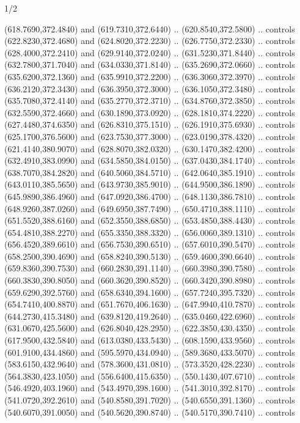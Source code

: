 \begin{flagdescription}{1/2}
\begin{scope}[xshift=0.5\flaglength,yshift=0.5\flagwidth,scale=\flagwidth/759]
\begin{scope}[y=0.8pt, x=0.8pt, yscale=-1,shift={(-720,-480)}]
\begin{scope}[cm={{1.14637,0.0,0.0,1.17117,(33.17849,82.1384)}}]
  (618.7690,372.4840) and (619.7310,372.6440) .. (620.8540,372.5800) .. controls
  (622.8230,372.4680) and (624.8020,372.2230) .. (626.7750,372.2330) .. controls
  (628.4000,372.2410) and (629.9140,372.0240) .. (631.5230,371.8440) .. controls
  (632.7800,371.7040) and (634.0330,371.8140) .. (635.2690,372.0660) .. controls
  (635.6200,372.1360) and (635.9910,372.2200) .. (636.3060,372.3970) .. controls
  (636.2120,372.3430) and (636.3950,372.3000) .. (636.1050,372.3480) .. controls
  (635.7080,372.4140) and (635.2770,372.3710) .. (634.8760,372.3850) .. controls
  (632.5590,372.4660) and (630.1890,373.0920) .. (628.1810,374.2220) .. controls
  (627.4480,374.6350) and (626.8310,375.1510) .. (626.1910,375.6930) .. controls
  (625.1700,376.5600) and (623.7530,377.3000) .. (623.0190,378.4320) .. controls
  (621.4140,380.9070) and (628.8070,382.0320) .. (630.1470,382.4200) .. controls
  (632.4910,383.0990) and (634.5850,384.0150) .. (637.0430,384.1740) .. controls
  (638.7070,384.2820) and (640.5060,384.5710) .. (642.0640,385.1910) .. controls
  (643.0110,385.5650) and (643.9730,385.9010) .. (644.9500,386.1890) .. controls
  (645.9890,386.4960) and (647.0920,386.4700) .. (648.1130,386.7810) .. controls
  (648.9260,387.0260) and (649.6950,387.7490) .. (650.4710,388.1110) .. controls
  (651.5520,388.6160) and (652.3550,388.6850) .. (653.4850,388.4430) .. controls
  (654.4810,388.2270) and (655.3350,388.3320) .. (656.0060,389.1310) .. controls
  (656.4520,389.6610) and (656.7530,390.6510) .. (657.6010,390.5470) .. controls
  (658.2500,390.4690) and (658.8240,390.5130) .. (659.4600,390.6640) .. controls
  (659.8360,390.7530) and (660.2830,391.1140) .. (660.3980,390.7580) .. controls
  (660.3830,390.8050) and (660.3620,390.8520) .. (660.3420,390.8980) .. controls
  (659.6290,392.5760) and (658.6340,394.1600) .. (657.7240,395.7320) .. controls
  (654.7410,400.8870) and (651.7670,406.1630) .. (647.9940,410.7870) .. controls
  (644.2730,415.3480) and (639.8120,419.2640) .. (635.0460,422.6960) .. controls
  (631.0670,425.5600) and (626.8040,428.2950) .. (622.3850,430.4350) .. controls
  (617.9500,432.5840) and (613.0380,433.5430) .. (608.1590,433.9560) .. controls
  (601.9100,434.4860) and (595.5970,434.0940) .. (589.3680,433.5070) .. controls
  (583.6150,432.9640) and (578.3600,431.0810) .. (573.3520,428.2230) .. controls
  (564.3830,423.1050) and (556.6400,415.6350) .. (550.1430,407.6710) .. controls
  (546.4920,403.1960) and (543.4970,398.1600) .. (541.3010,392.8170) .. controls
  (541.0720,392.2610) and (540.8580,391.7020) .. (540.6550,391.1360) .. controls
  (540.6070,391.0050) and (540.5620,390.8740) .. (540.5170,390.7410) .. controls

\end{scope}
\end{scope}
\end{scope}
\end{flagdescription}
